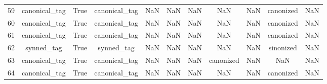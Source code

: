 \begin{table}[h!]
{\begin{tabular}{|c|c|c|c|c|c|c|c|c|c|c|}
         59 &             canonical\_tag &                              True &                canonical\_tag &                                  NaN &                                  NaN &                                  NaN &                                  NaN &                                  NaN &                            canonized &                                                NaN \\
         60 &             canonical\_tag &                              True &                canonical\_tag &                                  NaN &                                  NaN &                                  NaN &                                  NaN &                                  NaN &                            canonized &                                                NaN \\
         61 &             canonical\_tag &                              True &                canonical\_tag &                                  NaN &                                  NaN &                                  NaN &                                  NaN &                                  NaN &                            canonized &                                                NaN \\
         62 &                synned\_tag &                              True &                   synned\_tag &                                  NaN &                                  NaN &                                  NaN &                                  NaN &                                  NaN &                            sinonized &                                                NaN \\
         63 &             canonical\_tag &                              True &                canonical\_tag &                                  NaN &                                  NaN &                                  NaN &                            canonized &                                  NaN &                                  NaN &                                                NaN \\
         64 &             canonical\_tag &                              True &                canonical\_tag &                                  NaN &                                  NaN &                                  NaN &                                  NaN &                                  NaN &                            canonized &                                                NaN \\

\end{tabular}}
\end{table}
